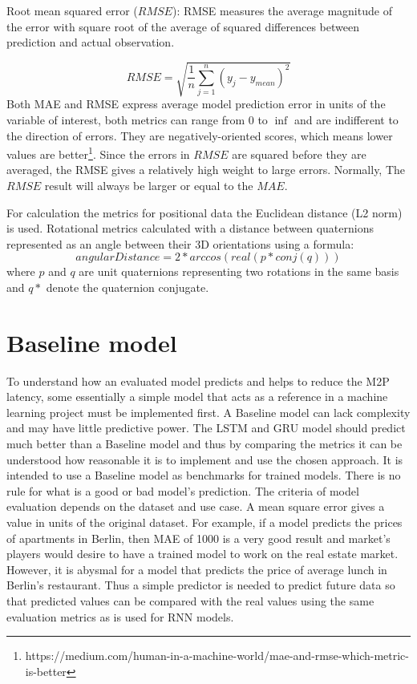 Root mean squared error ($RMSE$): RMSE measures the average magnitude of the error with square root of the average of squared differences between prediction and actual observation.

\begin{equation}
RMSE= \sqrt{ \frac{1}{n} \sum_{j=1}^{n} (y_j - y_{mean})^2}
\end{equation}
Both MAE and RMSE express average model prediction error in units of the variable of interest, both metrics can range from $0$ to $\inf$ and are indifferent to the direction of errors. They are negatively-oriented scores, which means lower values are better\footnote{https://medium.com/human-in-a-machine-world/mae-and-rmse-which-metric-is-better}. Since the errors in $RMSE$ are squared before they are averaged, the RMSE gives a relatively high weight to large errors. Normally, The $RMSE$ result will always be larger or equal to the $MAE$. 

For calculation the metrics for positional data the Euclidean distance (L2 norm) is used.  Rotational metrics calculated with a distance between quaternions represented as an angle between their 3D orientations using a formula:
\begin{equation}
angularDistance = 2*arccos(real(p*conj(q)))
\end{equation}
where $p$ and $q$ are unit quaternions representing two rotations in the same basis and $q*$ denote the quaternion conjugate.

\section{Baseline model}
\label{sec:eval:baseline}
To understand how an evaluated model predicts and helps to reduce the M2P latency, some essentially a simple model that acts as a reference in a machine learning project must be implemented first. A Baseline model can lack complexity and may have little predictive power. The LSTM and GRU model should predict much better than a Baseline model and thus by comparing the metrics it can be understood how reasonable it is to implement and use the chosen approach. It is intended to use a Baseline model as benchmarks for trained models. There is no rule for what is a good or bad model's prediction. The criteria of model evaluation depends on the dataset and use case. A mean square error gives a value in units of the original dataset. For example, if a model predicts the prices of apartments in Berlin, then MAE of 1000 is a very good result and market's players would desire to have a trained model to work on the real estate market. However, it is abysmal for a model that predicts the price of average lunch in Berlin's restaurant. Thus a simple predictor is needed to predict future data so that predicted values can be compared with the real values using the same evaluation metrics as is used for RNN models.

